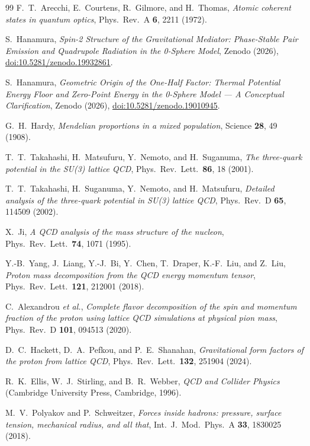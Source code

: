\documentclass[%
 reprint, amsmath,amssymb, aps, prb, ]{revtex4-2}
\numberwithin{equation}{section}
\begin{document}
\begin{thebibliography}{99}
F.~T.~Arecchi, E.~Courtens, R.~Gilmore, and H.~Thomas,
\emph{Atomic coherent states in quantum optics},
Phys.~Rev.~A \textbf{6}, 2211 (1972).

S.~Hanamura,
\emph{Spin-2 Structure of the Gravitational Mediator: Phase-Stable Pair Emission and Quadrupole Radiation in the 0-Sphere Model},
Zenodo (2026), \href{https://doi.org/10.5281/zenodo.19932861}{doi:10.5281/zenodo.19932861}.

S.~Hanamura,
\emph{Geometric Origin of the One-Half Factor: Thermal Potential Energy Floor and Zero-Point Energy in the 0-Sphere Model --- A Conceptual Clarification},
Zenodo (2026), \href{https://doi.org/10.5281/zenodo.19010945}{doi:10.5281/zenodo.19010945}.

G.~H.~Hardy,
\emph{Mendelian proportions in a mixed population},
Science \textbf{28}, 49 (1908).

T.~T.~Takahashi, H.~Matsufuru, Y.~Nemoto, and H.~Suganuma,
\emph{The three-quark potential in the SU(3) lattice QCD},
Phys.~Rev.~Lett.~\textbf{86}, 18 (2001).

T.~T.~Takahashi, H.~Suganuma, Y.~Nemoto, and H.~Matsufuru,
\emph{Detailed analysis of the three-quark potential in SU(3) lattice QCD},
Phys.~Rev.~D \textbf{65}, 114509 (2002).

X.~Ji,
\emph{A QCD analysis of the mass structure of the nucleon},
Phys.~Rev.~Lett.~\textbf{74}, 1071 (1995).

Y.-B.~Yang, J.~Liang, Y.-J.~Bi, Y.~Chen, T.~Draper, K.-F.~Liu, and Z.~Liu,
\emph{Proton mass decomposition from the QCD energy momentum tensor},
Phys.~Rev.~Lett.~\textbf{121}, 212001 (2018).

C.~Alexandrou \emph{et al.},
\emph{Complete flavor decomposition of the spin and momentum fraction of the proton using lattice QCD simulations at physical pion mass},
Phys.~Rev.~D \textbf{101}, 094513 (2020).

D.~C.~Hackett, D.~A.~Pefkou, and P.~E.~Shanahan,
\emph{Gravitational form factors of the proton from lattice QCD},
Phys.~Rev.~Lett.~\textbf{132}, 251904 (2024).

R.~K.~Ellis, W.~J.~Stirling, and B.~R.~Webber,
\emph{QCD and Collider Physics}
(Cambridge University Press, Cambridge, 1996).

M.~V.~Polyakov and P.~Schweitzer,
\emph{Forces inside hadrons: pressure, surface tension, mechanical radius, and all that},
Int.~J.~Mod.~Phys.~A \textbf{33}, 1830025 (2018).


\end{thebibliography}
\end{document}
